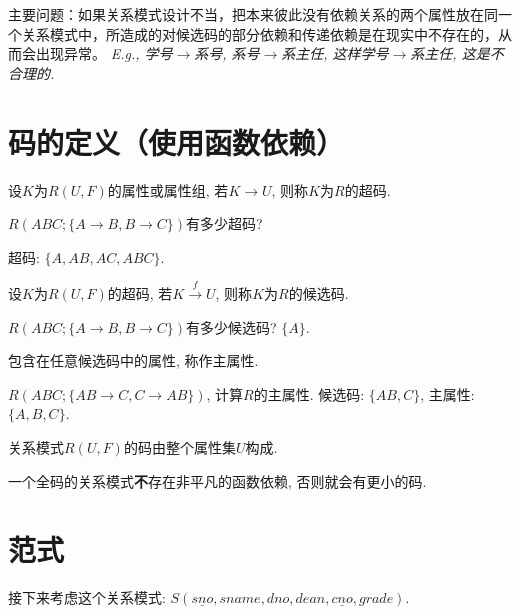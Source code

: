 主要问题：如果关系模式设计不当，把本来彼此没有依赖关系的两个属性放在同一个关系模式中，所造成的对候选码的部分依赖和传递依赖是在现实中不存在的，从而会出现异常。
\textit{E.g., 学号$\to$系号, 系号$\to$系主任, 这样学号$\to$系主任, 这是不合理的.}

\section{码的定义（使用函数依赖）}

\begin{definition}[超码]
  设$K$为$R(U,F)$的属性或属性组, 若$K\to U$, 则称$K$为$R$的超码.
\end{definition}

\begin{example}
  $R(ABC;\{A\to B,B\to C\})$有多少超码?

  超码: $\{A,AB,AC,ABC\}$.
\end{example}

\begin{definition}[候选码]
  设$K$为$R(U,F)$的超码, 若$K\overset{f}{\rightarrow} U$, 则称$K$为$R$的候选码.
\end{definition}

\begin{example}
  $R(ABC;\{A\to B,B\to C\})$有多少候选码? $\{A\}$.
\end{example}

\begin{definition}[主属性]
  包含在任意候选码中的属性, 称作主属性.
\end{definition}

\begin{example}
  $R(ABC;\{AB\to C,C\to AB\})$, 计算$R$的主属性. 候选码: $\{AB,C\}$, 主属性: $\{A,B,C\}$.
\end{example}

\begin{definition}[全码]
  关系模式$R(U,F)$的码由整个属性集$U$构成.
\end{definition}

\begin{remark}
  一个全码的关系模式\textbf{不}存在非平凡的函数依赖, 否则就会有更小的码.
\end{remark}

\section{范式}

接下来考虑这个关系模式: $S(\underline{sno},sname,dno,dean,\underline{cno},grade)$.

